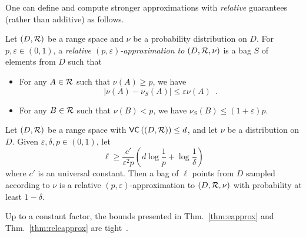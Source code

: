One can define and compute stronger approximations with \emph{relative}
guarantees (rather than additive) as follows.
\begin{definition}\label{def:releapprox}
  Let $(D,\mathcal{R})$ be a range space  and $\nu$ be a probability distribution on
  $D$. For $p,\varepsilon\in (0,1)$, a \emph{relative
  $(p,\varepsilon)$-approximation to $(D,\mathcal{R},\nu)$} is a bag $S$ of elements
  from $D$ such that 
  \begin{itemize}
    \item For any $A\in\mathcal{R}$ such that $\nu(A)\ge p$, we have 
      \[ |\nu(A) - \nu_S(A)|\le \varepsilon\nu(A)\enspace.\]
    \item For any $B\in\mathcal{R}$ such that $\nu(B)< p$, we have $\nu_S(B)\le
      (1+\varepsilon)p$.
  \end{itemize}
\end{definition}

\begin{theorem}\label{thm:releapprox}
  Let $(D,\mathcal{R})$ be a range space with $\mathsf{VC}\left((D,\mathcal{R})\right)\le d$, and
  let $\nu$ be a distribution on $D$. Given $\varepsilon,\delta,p\in(0,1)$, let 
  \begin{equation}\label{eq:releapprox}
    \ell\ge\frac{c'}{\varepsilon^2p}\left(d\log\frac{1}{p}+\log\frac{1}{\delta}\right)
  \end{equation}
  where $c'$ is an universal constant. Then a bag of $\ell$ points from $D$ sampled
  according to $\nu$ is a relative $(p,\varepsilon)$-approximation to
  $(D,\mathcal{R},\nu)$ with probability at least $1-\delta$.
\end{theorem}

Up to a constant factor, the bounds presented in Thm.~\ref{thm:eapprox}
and Thm.~\ref{thm:releapprox} are tight~\citep[Thm.~5]{LiLS01}. 

%


